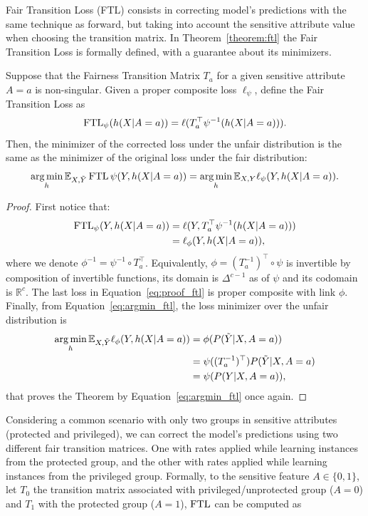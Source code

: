 Fair Transition Loss (FTL) consists in correcting model's predictions with the same technique as forward, but taking into account the sensitive attribute value when choosing the transition matrix. In Theorem~\ref{theorem:ftl} the Fair Transition Loss is formally defined, with a guarantee about its minimizers.

\begin{theorem}\label{theorem:ftl}
    Suppose that the Fairness Transition Matrix $T_a$ for a given sensitive attribute $A=a$ is non-singular. Given a proper composite loss $\ell_{\psi}$, define the Fair Transition Loss as
    \[\operatorname{FTL}_{\psi}(h(X|A=a)) = \ell(T^{\top}_a \psi^{-1}(h(X|A=a))).\]
    Then, the minimizer of the corrected loss under the unfair distribution is the same as the minimizer of the original loss under the fair distribution:
    \[  \operatorname*{arg\,min}\limits_{h}\mathbb{E}_{X,\tilde{Y}}\operatorname{FTL}{\psi}(Y, h(X|A=a)) = \operatorname*{arg\,min}\limits_{h}\mathbb{E}_{X,Y}\ell_{\psi}(Y, h(X|A=a)).\]
\end{theorem}
\begin{proof}
    First notice that:
    \begin{align} \label{eq:proof_ftl}
        \operatorname{FTL}_{\psi}(Y, h(X|A=a)) &= \ell(Y, T^{\top}_a \psi^{-1}(h(X|A=a))) \nonumber \\
        &= \ell_{\phi}(Y, h(X|A=a)),
    \end{align}
    where we denote $\phi^{-1} = \psi^{-1} \circ T_a^{\top}$. Equivalently, $\phi = (T_a^{-1})^{\top} \circ \psi$ is invertible by composition of invertible functions, its domain is $\Delta^{c-1}$ as of $\psi$ and its codomain is $\mathbb{R}^{c}$. The last loss in Equation~\ref{eq:proof_ftl} is proper composite with link $\phi$. Finally, from Equation~\ref{eq:argmin_ftl}, the loss minimizer over the unfair distribution is
    \begin{align}
        \operatorname*{arg\,min}\limits_{h}\mathbb{E}_{X,\tilde{Y}}\ell_{\phi}(Y, h(X|A=a)) &= \phi(P(\tilde{Y}|X,A=a)) \\
        &= \psi((T_a^{-1})^{\top}) P(\tilde{Y}|X,A=a) \\
        &= \psi(P(Y|X,A=a)),
    \end{align}
    that proves the Theorem by Equation~\ref{eq:argmin_ftl} once again.
\end{proof}

Considering a common scenario with only two groups in sensitive attributes (protected and privileged), we can correct the model's predictions using two different fair transition matrices. One with rates applied while learning instances from the protected group, and the other with rates applied while learning instances from the privileged group. Formally, to the sensitive feature $A \in \{0,1\}$, let $T_0$ the transition matrix associated with privileged/unprotected group ($A = 0$) and $T_1$ with the protected group ($A = 1$), $\operatorname{FTL}$ can be computed as

